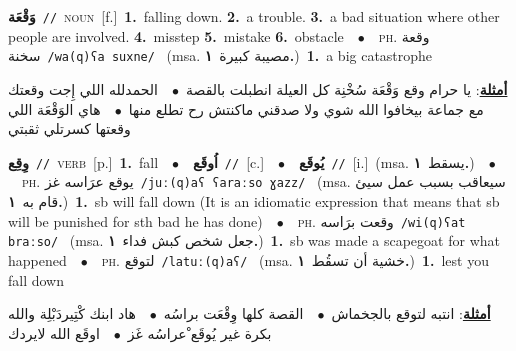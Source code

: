 \documentclass[10pt,a4paper,twoside]{article} %
\begin{document}
\begin{multicols}{2}
{\setlength\topsep{0pt}\textbf{\foreignlanguage{arabic}{وَقْعَة}}\ {\color{gray}\texttt{//}\color{black}}\ \textsc{noun}\ [f.]\ \textbf{1.}~falling down.  \textbf{2.}~a trouble.  \textbf{3.}~a bad situation where other people are involved.  \textbf{4.}~misstep  \textbf{5.}~mistake  \textbf{6.}~obstacle\ \ $\bullet$\ \ \textsc{ph.} \color{gray} \foreignlanguage{arabic}{وقعة سخنة}\color{black}\ {\color{gray}\texttt{/{\sffamily wa(q)ʕa suxne}/}\color{black}}\ \color{gray} (msa. \foreignlanguage{arabic}{مصيبة كبيرة}~\foreignlanguage{arabic}{\textbf{١.}})\color{black}\ \textbf{1.}~a big catastrophe\  \begin{flushright}\color{gray}\foreignlanguage{arabic}{\textbf{\underline{\foreignlanguage{arabic}{أمثلة}}}: يا حرام وقع وَقْعَة سُخْنِة كل العيلة انطبلت بالقصة\ $\bullet$\ \  الحمدلله اللي إِجت وقعتك مع جماعة بيخافوا الله شوي ولا صدقني ماكنتش رح تطلع منها\ $\bullet$\ \  هاي الوَقْعَة اللي وقعتها كسرتلي ثقبتي}\end{flushright}\color{black}} \vspace{2mm}

{\setlength\topsep{0pt}\textbf{\foreignlanguage{arabic}{وِقِع}}\ {\color{gray}\texttt{//}\color{black}}\ \textsc{verb}\ [p.]\ \textbf{1.}~fall\ \ $\bullet$\ \ \setlength\topsep{0pt}\textbf{\foreignlanguage{arabic}{اُوقَع}}\ {\color{gray}\texttt{//}\color{black}}\ [c.]\ \ $\bullet$\ \ \setlength\topsep{0pt}\textbf{\foreignlanguage{arabic}{يُوقَع}}\ {\color{gray}\texttt{//}\color{black}}\ [i.]\ \color{gray}(msa. \foreignlanguage{arabic}{يسقط}~\foreignlanguage{arabic}{\textbf{١.}})\color{black}\ \ $\bullet$\ \ \textsc{ph.} \color{gray} \foreignlanguage{arabic}{يوقع عرَاسه غز}\color{black}\ {\color{gray}\texttt{/{\sffamily juː(q)aʕ ʕaraːso ɣazz}/}\color{black}}\ \color{gray} (msa. \foreignlanguage{arabic}{سيعاقب بسبب عمل سيئ قام به}~\foreignlanguage{arabic}{\textbf{١.}})\color{black}\ \textbf{1.}~sb will fall down (It is an idiomatic expression that means that sb will be punished for sth bad he has done)\ \ $\bullet$\ \ \textsc{ph.} \color{gray} \foreignlanguage{arabic}{وقعت برَاسه}\color{black}\ {\color{gray}\texttt{/{\sffamily wi(q)ʕat braːso}/}\color{black}}\ \color{gray} (msa. \foreignlanguage{arabic}{جعل شخص كبش فداء}~\foreignlanguage{arabic}{\textbf{١.}})\color{black}\ \textbf{1.}~sb was made a scapegoat for what happened\ \ $\bullet$\ \ \textsc{ph.} \color{gray} \foreignlanguage{arabic}{لتوقع}\color{black}\ {\color{gray}\texttt{/{\sffamily latuː(q)aʕ}/}\color{black}}\ \color{gray} (msa. \foreignlanguage{arabic}{خشية أن تسقُط}~\foreignlanguage{arabic}{\textbf{١.}})\color{black}\ \textbf{1.}~lest you fall down\  \begin{flushright}\color{gray}\foreignlanguage{arabic}{\textbf{\underline{\foreignlanguage{arabic}{أمثلة}}}: انتبه لتوقع بالجخماش\ $\bullet$\ \  القصة كلها وِقْعَت براسُه\ $\bullet$\ \  هاد ابنك كْتِيردَبْلِة والله بكرة غير يُوقَع ْعراسُه غَز\ $\bullet$\ \  اوقَع الله لايردك}\end{flushright}\color{black}} \vspace{2mm}


\end{multicols}
\end{document}
